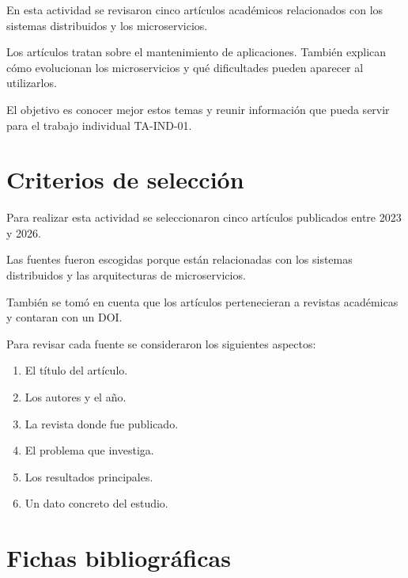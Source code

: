 \documentclass[12pt,a4paper]{article}
\begin{document}
En esta actividad se revisaron
cinco artículos académicos
relacionados con los sistemas
distribuidos y los microservicios.

Los artículos tratan sobre
el mantenimiento de aplicaciones.
También explican cómo evolucionan
los microservicios y qué dificultades
pueden aparecer al utilizarlos.

El objetivo es conocer mejor
estos temas y reunir información
que pueda servir para el trabajo
individual TA-IND-01.


\section{Criterios de selección}

Para realizar esta actividad
se seleccionaron cinco artículos
publicados entre 2023 y 2026.

Las fuentes fueron escogidas
porque están relacionadas con
los sistemas distribuidos
y las arquitecturas
de microservicios.

También se tomó en cuenta
que los artículos pertenecieran
a revistas académicas
y contaran con un DOI.

Para revisar cada fuente
se consideraron los siguientes
aspectos:

\begin{enumerate}[nosep]
\item El título del artículo.
\item Los autores y el año.
\item La revista donde fue publicado.
\item El problema que investiga.
\item Los resultados principales.
\item Un dato concreto del estudio.
\end{enumerate}


\section{Fichas bibliográficas}

\end{document}
